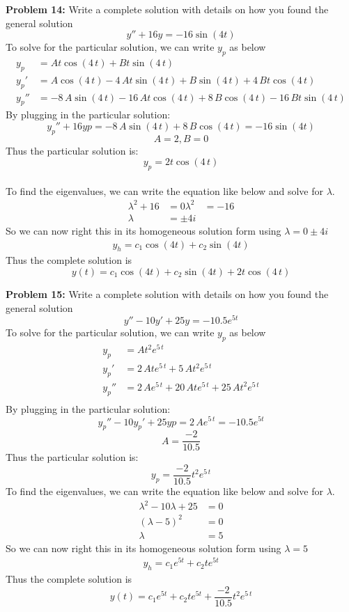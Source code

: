 \documentclass[12pt]{article}
\begin{document}
\newpage 

\noindent \textbf{Problem 14: }Write a complete solution with details on how you found the general solution
	$$
	y'' + 16y = -16\sin(4t)
	$$
To solve for the particular solution, we can write $y_p$ as below
	\begin{align*}
		y_p &= At\cos \left( 4\,t \right) +Bt\sin \left( 4\,t \right) \\
		y_p'&= A\cos \left( 4\,t \right) -4\,At\sin \left( 4\,t \right) +B\sin\left( 4\,t \right) +4\,Bt\cos \left( 4\,t \right) \\
		y_p'' &= -8\,A\sin \left( 4\,t \right) -16\,At\cos \left( 4\,t \right) +8\,B\cos \left( 4\,t \right) -16\,Bt\sin \left( 4\,t \right) 
	\end{align*}
By plugging in the particular solution:
		$$
		y_p'' + 16yp = -8\,A\sin \left( 4\,t \right) +8\,B\cos \left( 4\,t \right) = -16\sin(4t)
		$$
		$$
		A = 2, B = 0
		$$
Thus the particular solution is: 
	$$
	y_p = 2t\cos \left( 4\,t \right)
	$$
\\
To find the eigenvalues, we can write the equation like below and solve for $\lambda$.
	\begin{align*}
		\lambda^2 + 16 &= 0
		\lambda^2 &= -16 \\
		\lambda &= \pm 4i
	\end{align*}
So we can now right this in its homogeneous solution form using $\lambda = 0 \pm 4i$
	\begin{align*}
		y_h = c_1\cos(4t) + c_2\sin(4t)
	\end{align*}
Thus the complete solution is 
	$$
	y(t) = c_1\cos(4t) + c_2\sin(4t) + 2t\cos \left( 4\,t \right)
	$$


\newpage

\noindent \textbf{Problem 15: }Write a complete solution with details on how you found the general solution
	$$
	y''- 10y' + 25y = -10.5e^{5t}
	$$
To solve for the particular solution, we can write $y_p$ as below
	\begin{align*}
		y_p &= A{t}^{2}{{e}^{5\,t}} \\
		y_p' &= 2\,At{{e}^{5\,t}}+5\,A{t}^{2}{{e}^{5\,t}} \\
		y_p'' &= 2\,A{{e}^{5\,t}}+20\,At{{e}^{5\,t}}+25\,A{t}^{2}{{e}^{5\,t}} \\
	\end{align*}
By plugging in the particular solution:
		$$
		y_p'' - 10y_p' + 25yp = 2\,A{{e}^{5\,t}} = -10.5e^{5t}
		$$
		$$
		A = \frac{-2}{10.5}
		$$
Thus the particular solution is: 
$$
y_p = \frac{-2}{10.5}{t}^{2}{{e}^{5\,t}}
$$
To find the eigenvalues, we can write the equation like below and solve for $\lambda$.
	\begin{align*}
		\lambda^2 - 10\lambda + 25 &= 0 \\
		(\lambda - 5)^2 &= 0 \\
		\lambda &= 5
	\end{align*}
So we can now right this in its homogeneous solution form using $\lambda = 5$
	\begin{align*}
	y_h = c_1e^{5t} + c_2te^{5t}
	\end{align*}
Thus the complete solution is 
	$$
	y(t) = c_1e^{5t} + c_2te^{5t} + \frac{-2}{10.5}{t}^{2}{{e}^{5\,t}}
	$$
\end{document}
